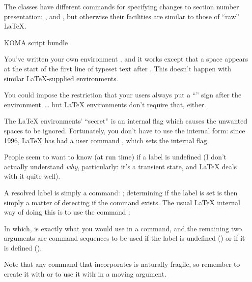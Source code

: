 The  classes have different commands for specifying
changes to section number presentation: ,
 and , but otherwise
their facilities are similar to those of ``raw'' \LaTeX{}.
\begin{ctanrefs}
\item[\nothtml{\rmfamily}KOMA script bundle]
\end{ctanrefs}


You've written your own environment , and it works
except that a space appears at the start of the first line of typeset
text after .  This doesn't happen with similar
\LaTeX{}-supplied environments.

You could impose the restriction that your users always put a
``\texttt{\textpercent{}}'' sign after the environment~\dots{}\nothtml{\@} but
\LaTeX{} environments don't require that, either.

The \LaTeX{} environments' ``secret'' is an internal flag which causes
the unwanted spaces to be ignored.  Fortunately, you don't have to use
the internal form: since 1996, \LaTeX{} has had a user command
, which sets the internal flag.


People seem to want to know (at run time) if a label is undefined (I
don't actually understand \emph{why}, particularly: it's a transient
state, and \LaTeX{} deals with it quite well).

A resolved label is simply a command:
\texttt{}; determining if the label is set is
then simply a matter of detecting if the command exists.  The usual
\LaTeX{} internal way of doing this is to use the command
:
\begin{quote}
\end{quote}
In which,  is exactly what you would use in
a  command, and the remaining two arguments are command
sequences to be used if the label is undefined
() or if it is defined
().

Note that any command that incorporates  is naturally
fragile, so remember to create it with  or to
use it with  in a moving argument.


